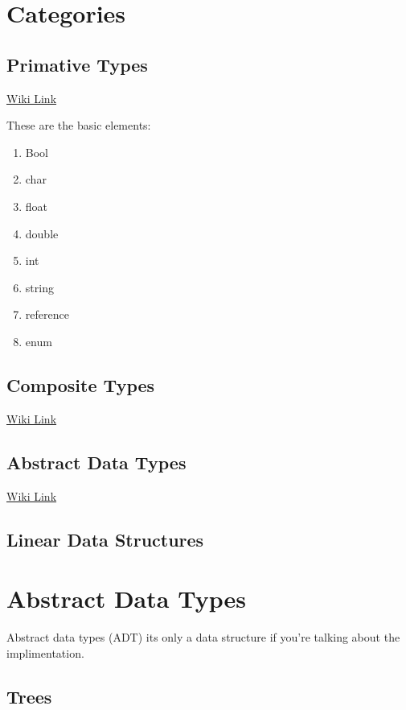 \documentclass{notes}
\begin{document}
\chapter{Categories}
\section{Primative Types}

 \href{https://en.wikipedia.org/wiki/Primitive_data_type}{Wiki Link}

These are the basic elements:
	\begin{enumerate}
		\item Bool
		\item char
		\item float
		\item double
		\item int
		\item string
		\item reference
		\item enum
	\end{enumerate}

\section{Composite Types}

\href{https://en.wikipedia.org/wiki/Composite_data_type}{Wiki Link}


\section{Abstract Data Types}

\href{https://en.wikipedia.org/wiki/Abstract_data_type}{Wiki Link}

\section{Linear Data Structures}



\chapter{Abstract Data Types}
Abstract data types (ADT) \ra its only a data structure if you're talking about the implimentation.

\section{Trees}
\end{document}
